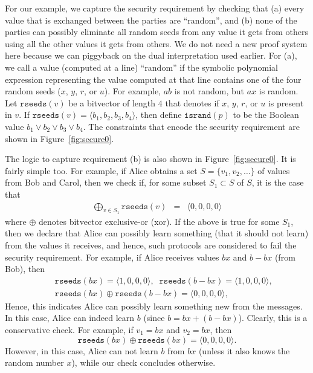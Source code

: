 \documentclass[preprint]{sig-alternate-05-2015}
\begin{document}
For our example, we capture the security requirement by checking that 
(a) every value that is exchanged between the parties are ``random'',
and
(b) none of the parties can possibly eliminate all random seeds from
any value it gets from others using all the other values it gets from others.
We do not need a new proof system here because we can piggyback on the
dual interpretation used earlier.
For (a), we call a value (computed at a line) ``random'' 
if the symbolic polynomial expression representing the value computed
at that line contains one of the four random seeds ($x$, $y$, $r$, or $u$).
For example, $ab$ is not random, but $ax$ is random.
Let $\mathtt{rseeds}(v)$ be a bitvector of length $4$ that denotes if
$x$, $y$, $r$, or $u$ is present in $v$.
If $\mathtt{rseeds}(v) = \langle b_1,b_2,b_3,b_4\rangle$,
then define
$\mathtt{isrand}(p)$  to be the Boolean value
$b_1\vee b_2\vee b_3\vee b_4$.
The constraints that encode the
security requirement are shown in Figure~\ref{fig:secure0}. 

The logic to capture requirement (b)  is also shown in
Figure~\ref{fig:secure0}. It is fairly simple too. 
For example, if Alice obtains a set $S = \{v_1, v_2, \ldots\}$ of values
from Bob and Carol, then we check if, for some subset $S_1\subset S$ of $S$,
it is the case that
\begin{eqnarray*}
  \bigoplus_{v \in S_1}  \mathtt{rseeds}(v) & = & \langle 0,0,0,0\rangle
\end{eqnarray*}
where $\oplus$ denotes bitvector exclusive-or (xor).
If the above is true for some $S_1$, then we declare that Alice can
possibly learn something (that it should not learn) from the values it receives,
and hence, such protocols are considered to fail the security requirement.
For example,
if Alice receives values $bx$ and $b-bx$ (from Bob), then
\begin{eqnarray*}
  &&\mathtt{rseeds}(bx) = \langle 1,0,0,0\rangle,
\;\; 
\mathtt{rseeds}(b-bx) = \langle 1,0,0,0\rangle,
\\ &&
\mathtt{rseeds}(bx) \oplus \mathtt{rseeds}(b-bx) = \langle 0,0,0,0\rangle,
\end{eqnarray*}
Hence, this indicates Alice can possibly learn something new from the messages.
In this case, Alice can indeed learn $b$ (since $b = bx + (b-bx)$).
Clearly, this is a conservative check. For example,
if $v_1 = bx$ and $v_2 = bx$, then 
$$
\mathtt{rseeds}(bx) \oplus \mathtt{rseeds}(bx) = \langle 0,0,0,0\rangle.
$$
However, in this case, Alice can not learn $b$ from $bx$ (unless 
it also knows the random number $x$), while our check concludes otherwise.
\end{document}
